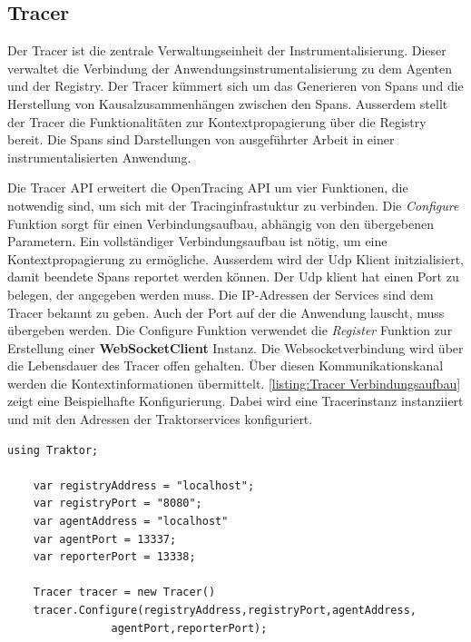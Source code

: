 \subsection{Tracer}
\label{subsection:Tracer}
Der Tracer ist die zentrale Verwaltungseinheit der Instrumentalisierung. Dieser verwaltet die Verbindung der Anwendungsinstrumentalisierung zu dem Agenten und der Registry. Der Tracer kümmert sich um das Generieren von Spans und die Herstellung von Kausalzusammenhängen zwischen den Spans. Ausserdem stellt der Tracer die Funktionalitäten zur Kontextpropagierung über die Registry bereit. Die Spans sind Darstellungen von ausgeführter Arbeit in einer instrumentalisierten Anwendung. 

Die Tracer API erweitert die OpenTracing API um vier Funktionen, die notwendig sind, um sich mit der Tracinginfrastuktur zu verbinden. Die \emph{Configure} Funktion sorgt für einen Verbindungsaufbau, abhängig von den übergebenen Parametern. Ein vollständiger Verbindungsaufbau ist nötig, um eine Kontextpropagierung zu ermögliche. Ausserdem wird der Udp Klient initzialisiert, damit beendete Spans reportet werden können. Der Udp klient hat einen Port zu belegen, der angegeben werden muss. Die IP-Adressen der Services sind dem Tracer bekannt zu geben. Auch der Port auf der die Anwendung lauscht, muss übergeben werden. Die Configure Funktion verwendet die \emph{Register} Funktion zur Erstellung einer \textbf{WebSocketClient} Instanz. Die Websocketverbindung wird über die Lebensdauer des Tracer offen gehalten. Über diesen Kommunikationskanal werden die Kontextinformationen übermittelt. \cref{listing:Tracer Verbindungsaufbau} zeigt eine Beispielhafte Konfigurierung. Dabei wird eine Tracerinstanz instanziiert und mit den Adressen der Traktorservices konfiguriert.

\begin{minipage}[]{\textwidth}
	\begin{lstlisting}[frame=trBL]
	using Traktor;
	
	var registryAddress = "localhost";
	var registryPort = "8080";
	var agentAddress = "localhost"
	var agentPort = 13337;
	var reporterPort = 13338;
	
	Tracer tracer = new Tracer()
	tracer.Configure(registryAddress,registryPort,agentAddress,
				agentPort,reporterPort);
	
	\end{lstlisting}
	\label{listing:Tracer Verbindungsaufbau}
\end{minipage} 

